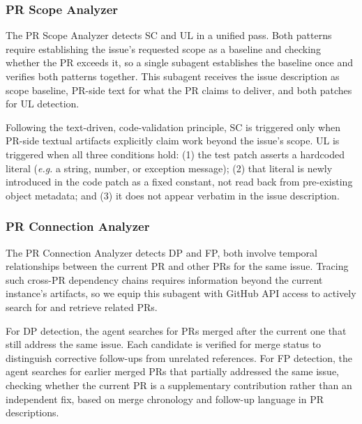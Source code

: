 \documentclass[sigconf, review, anonymous]{acmart}
\newcommand{\eg}{\textit{e.g.}\xspace}
\begin{document}
    \subsubsection{PR Scope Analyzer}
    \label{sec:scope_analyzer}

    The PR Scope Analyzer detects SC and UL in a unified pass. Both                                                                          
  patterns require establishing the issue's requested scope as a                                                                         
  baseline and checking whether the PR exceeds it, so a single
  subagent establishes the baseline once and verifies both patterns                                                                        
  together. This subagent receives the issue description as scope
  baseline, PR-side text for what the PR claims to deliver, and both                                                                       
  patches for UL detection. 

    Following the text-driven, code-validation principle, SC is triggered only when PR-side textual artifacts explicitly claim work beyond the issue's scope. UL is triggered when all three conditions hold: (1) the test patch asserts a hardcoded literal (\eg a string, number, or exception message); (2) that literal is newly introduced in the code patch as a fixed constant, not read back from pre-existing object metadata; and (3) it does not appear verbatim in the issue description.  

    \subsubsection{PR Connection Analyzer}
    \label{sec:connection_analyzer}

    The PR Connection Analyzer detects DP and FP, both involve temporal relationships between the current                                                                      PR and other PRs for the same issue. Tracing such cross-PR                                                                             dependency chains requires information beyond the current                                                                                instance's artifacts, so we equip this subagent with GitHub API
  access to actively search for and retrieve related PRs. 

    For DP detection, the agent searches for PRs merged after the current one that still address the same issue. Each candidate is verified for merge status to distinguish corrective follow-ups from unrelated references. For FP detection, the agent searches for earlier merged PRs that partially addressed the same issue, checking whether the current PR is a supplementary contribution rather than an independent fix, based on merge chronology and follow-up language in PR descriptions.
\end{document}
